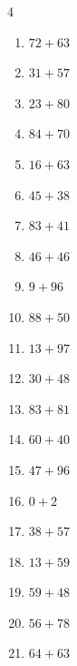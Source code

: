 \begin{multicols}{4}
\begin{enumerate}
  \item $72+63$
        \phantom{$=135$}

  \item $31+57$
        \phantom{$=88$}

  \item $23+80$
        \phantom{$=103$}

  \item $84+70$
        \phantom{$=154$}

  \item $16+63$
        \phantom{$=79$}

  \item $45+38$
        \phantom{$=83$}

  \item $83+41$
        \phantom{$=124$}

\columnbreak %

  \item $46+46$
        \phantom{$=92$}

  \item $9+96$
        \phantom{$=105$}

  \item $88+50$
        \phantom{$=138$}

  \item $13+97$
        \phantom{$=110$}

  \item $30+48$
        \phantom{$=78$}

  \item $83+81$
        \phantom{$=164$}

  \item $60+40$
        \phantom{$=100$}

  \item $47+96$
        \phantom{$=143$}

  \item $0+2$
        \phantom{$=2$}

  \item $38+57$
        \phantom{$=95$}

  \item $13+59$
        \phantom{$=72$}

  \item $59+48$
        \phantom{$=107$}

  \item $56+78$
        \phantom{$=134$}

  \item $64+63$
        \phantom{$=127$}


\end{enumerate}
\end{multicols}
